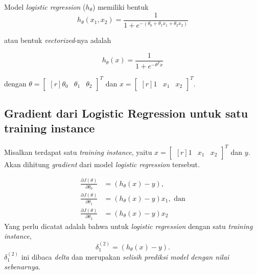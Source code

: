 \documentclass[12pt]{article}
\begin{document}
Model \textit{logistic regression} ($h_\theta$) memiliki bentuk
\begin{equation}
	h_\theta(x_1, x_2) = \frac{1}{1+e^{-(\theta_0 + \theta_1 x_1 + \theta_2 x_2)}}
\end{equation}

atau bentuk \textit{vectorized}-nya adalah

\begin{equation}
	h_\theta(x) = \frac{1}{1+e^{-\theta^T x}}
\end{equation}

dengan $\theta = \begin{bmatrix}[r]
	\theta_0 & \theta_1 & \theta_2
\end{bmatrix}^T$ dan $x = \begin{bmatrix}[r]
	1 & x_1 & x_2
\end{bmatrix}^T$.

\subsection*{Gradient dari Logistic Regression untuk satu training instance}
Misalkan terdapat satu \textit{training instance}, yaitu $x = \begin{bmatrix}[r]
	1 & x_1 & x_2
\end{bmatrix}^T$ dan $y$. Akan dihitung \textit{gradient} dari model \textit{logistic regression} tersebut.

\begin{align}
	\frac{\partial J(\theta)}{\partial \theta_0} &= (h_\theta(x) - y), \label{eq:gradient-lr-1} \\
	\frac{\partial J(\theta)}{\partial \theta_1} &= (h_\theta(x) - y) x_1, \text{ dan} \label{eq:gradient-lr-2} \\	
	\frac{\partial J(\theta)}{\partial \theta_2} &= (h_\theta(x) - y) x_2 \label{eq:gradient-lr-3}	
\end{align}
Yang perlu dicatat adalah bahwa untuk \textit{logistic regression} dengan satu \textit{training instance},
\begin{equation*}
	\delta^{(2)}_1 = (h_\theta(x) - y).
\end{equation*}
$\delta^{(2)}_1$ ini dibaca \textit{delta} dan merupakan \textit{selisih prediksi model dengan nilai sebenarnya}.
 
\end{document}
